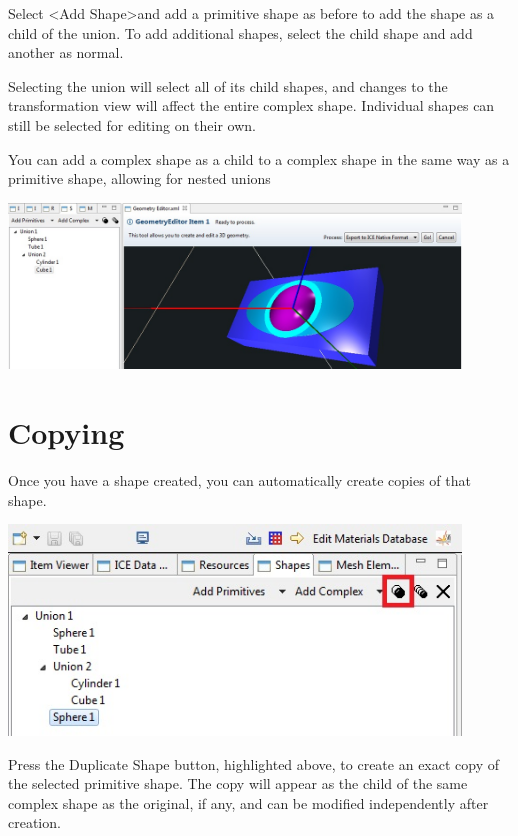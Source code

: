 Select \textless Add Shape\textgreater and add a primitive shape as before to
add the shape as a child of the union. To add additional shapes, select the
child shape and add another as normal.

Selecting the union will select all of its child shapes, and changes to the
transformation view will affect the entire complex shape. Individual shapes can
still be selected for editing on their own.

You can add a complex shape as a child to a complex shape in the same way as a
primitive shape, allowing for nested unions

\begin{center}
\includegraphics[width=12cm]{images/GeometryStackedUnions.jpg}
\end{center}

\section{Copying}

Once you have a shape created, you can automatically create copies of that
shape. 

\begin{center}
\includegraphics[width=12cm]{images/GeometryDuplicateShape.jpg}
\end{center}

Press the Duplicate Shape button, highlighted above, to create an exact copy of
the selected primitive shape. The copy will appear as the child of the same
complex shape as the original, if any, and can be modified independently after
creation.

